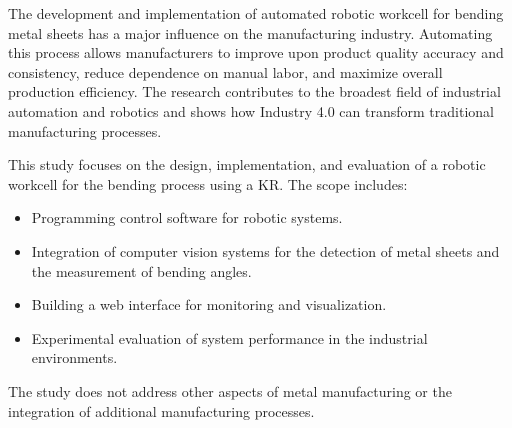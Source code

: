 The development and implementation of automated robotic workcell for bending metal sheets has a major influence on the manufacturing industry. \cite{russmann2015industry} Automating this process allows manufacturers to improve upon product quality accuracy and consistency, reduce dependence on manual labor, and maximize overall production efficiency. The research contributes to the broadest field of industrial automation and robotics and shows how Industry 4.0 can transform traditional manufacturing processes.

This study focuses on the design, implementation, and evaluation of a robotic workcell for the bending process using a KR. The scope includes:
\begin{itemize}
    \item Programming control software for robotic systems. 
    \item Integration of computer vision systems for the detection of metal sheets and the measurement of bending angles.
    \item Building a web interface for monitoring and visualization.
    \item Experimental evaluation of system performance in the industrial environments. 
\end{itemize}

The study does not address other aspects of metal manufacturing or the integration of additional manufacturing processes.